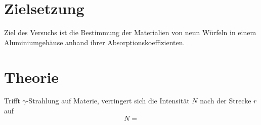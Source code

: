 \section{Zielsetzung}
\label{sec:Zielsetzung}

Ziel des Versuchs ist die Bestimmung der Materialien von neun Würfeln in einem
Aluminiumgehäuse anhand ihrer Absorptionskoeffizienten.

\section{Theorie}
\label{sec:Theorie}

Trifft $\gamma$-Strahlung auf Materie, verringert sich die Intensität $N$
nach der Strecke $r$ auf
\begin{equation}
  N =
\end{equation}


